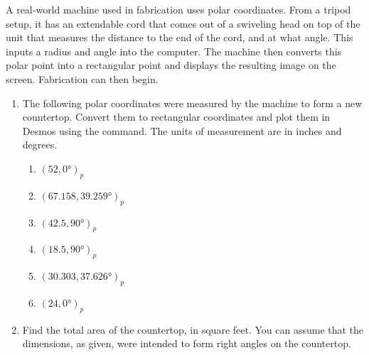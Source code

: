\begin{myExit}
	A real-world machine used in fabrication uses polar coordinates. From a tripod setup, it has an extendable cord that comes out of a swiveling head on top of the unit that measures the distance to the end of the cord, and at what angle. This inputs a radius and angle into the computer. The machine then converts this polar point into a rectangular point and displays the resulting image on the screen. Fabrication can then begin. %
		\begin{enumerate}
			\item The following polar coordinates were measured by the machine to form a new countertop. Convert them to rectangular coordinates and plot them in Desmos using the  command. The units of measurement are in inches and degrees.
				\begin{enumerate}[itemsep=0.5cm]
					\item $(52,\ang{0})_p$
					\item  $(67.158,\ang{39.259})_p$
					\item $(42.5,\ang{90})_p$
					\item $(18.5,\ang{90})_p$
					\item  $(30.303,\ang{37.626})_p$
					\item $(24,\ang{0})_p$
				\end{enumerate}
			\vfill
			\item Find the total area of the countertop, in square feet. You can assume that the dimensions, as given, were intended to form right angles on the countertop.
			\vfill
		\end{enumerate}
\end{myExit}
